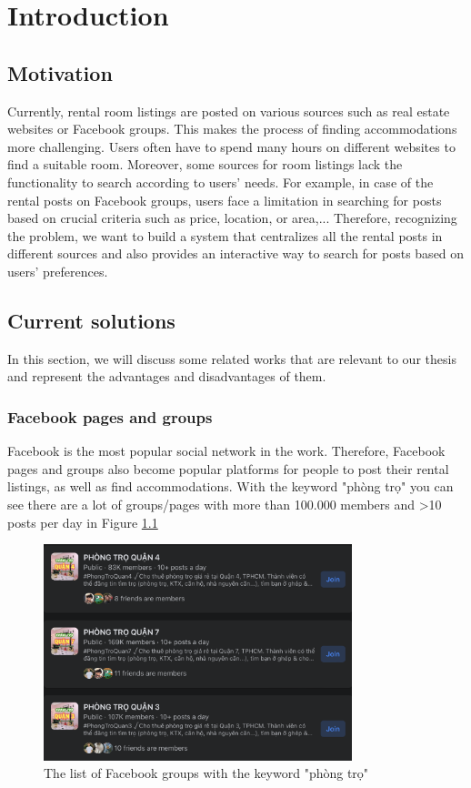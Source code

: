 \chapter{Introduction}

\section{Motivation}
Currently, rental room listings are posted on various sources such as real estate websites or Facebook groups. This makes the process of finding accommodations more challenging. Users often have to spend many hours on different websites to find a suitable room. Moreover, some sources for room listings lack the functionality to search according to users' needs. For example, in case of the rental posts on Facebook groups, users face a limitation in searching for posts based on crucial criteria such as price, location, or area,... Therefore, recognizing the problem, we want to build a system that centralizes all the rental posts in different sources and also provides an interactive way to search for posts based on users' preferences.

\section{Current solutions}
In this section, we will discuss some related works that are relevant to our thesis and represent the advantages and disadvantages of them.

\subsection{Facebook pages and groups}
Facebook is the most popular social network in the work. Therefore, Facebook pages and groups also become popular platforms for people to post their rental listings, as well as find accommodations. With the keyword "phòng trọ" you can see there are a lot of groups/pages with more than 100.000 members and >10 posts per day in Figure \ref{fig:facebook-group}

\begin{figure}[ht]
    \centering
    \includegraphics[width=0.8\textwidth]{images/1.Introduction/facebook_groups.png}
    \caption{The list of Facebook groups with the keyword "phòng trọ"}
    \label{fig:facebook-group}
\end{figure}


